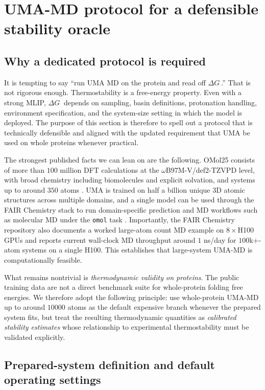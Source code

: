 \documentclass[11pt]{article}
\newcommand{\dG}{\ensuremath{\Delta G \ }}
\begin{document}
\section{UMA-MD protocol for a defensible stability oracle}
\label{sec:uma_dup}

\subsection{Why a dedicated protocol is required}

It is tempting to say ``run UMA MD on the protein and read off $\dG$.'' That is not rigorous enough. Thermostability is a free-energy property. Even with a strong MLIP, $\dG$ depends on sampling, basin definitions, protonation handling, environment specification, and the system-size setting in which the model is deployed. The purpose of this section is therefore to spell out a protocol that is technically defensible and aligned with the updated requirement that UMA be used on whole proteins whenever practical.

The strongest published facts we can lean on are the following. OMol25 consists of more than $100$ million DFT calculations at the $\omega$B97M-V/def2-TZVPD level, with broad chemistry including biomolecules and explicit solvation, and systems up to around $350$ atoms \citep{levine2025omol25}. UMA is trained on half a billion unique 3D atomic structures across multiple domains, and a single model can be used through the FAIR Chemistry stack to run domain-specific prediction and MD workflows such as molecular MD under the \texttt{omol} task \citep{wood2025uma,fairchem2025github}. Importantly, the FAIR Chemistry repository also documents a worked large-atom count MD example on $8\times$H100 GPUs and reports current wall-clock MD throughput around $1$ ns/day for $100$k$+$-atom systems \citep{fairchem2025github} on a single H100. This establishes that large-system UMA-MD is computationally feasible.

What remains nontrivial is \emph{thermodynamic validity on proteins}. The public training data are not a direct benchmark suite for whole-protein folding free energies. We therefore adopt the following principle: use whole-protein UMA-MD up to around $10000$ atoms as the default expensive branch whenever the prepared system fits, but treat the resulting thermodynamic quantities as \emph{calibrated stability estimates} whose relationship to experimental thermostability must be validated explicitly.

\subsection{Prepared-system definition and default operating settings}
\end{document}
